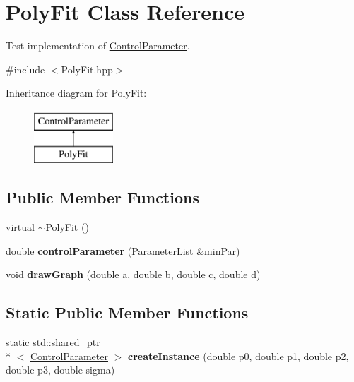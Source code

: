 \hypertarget{class_poly_fit}{\section{Poly\-Fit Class Reference}
\label{class_poly_fit}
}


Test implementation of \hyperlink{class_control_parameter}{Control\-Parameter}.  




{\ttfamily \#include $<$Poly\-Fit.\-hpp$>$}

Inheritance diagram for Poly\-Fit\-:\begin{figure}[H]
\begin{center}
\leavevmode
\includegraphics[height=2.000000cm]{class_poly_fit}
\end{center}
\end{figure}
\subsection*{Public Member Functions}
\begin{DoxyCompactItemize}
\item 
virtual \hyperlink{class_poly_fit_a3462736e02f02d3ab46ccd64aaf235d3}{$\sim$\-Poly\-Fit} ()
\item 
\hypertarget{class_poly_fit_a570b3d6805251459ef55904219726809}{double {\bfseries control\-Parameter} (\hyperlink{class_parameter_list}{Parameter\-List} \&min\-Par)}\label{class_poly_fit_a570b3d6805251459ef55904219726809}

\item 
\hypertarget{class_poly_fit_ad90dd471fea18051d5c0c2e5b483f0a5}{void {\bfseries draw\-Graph} (double a, double b, double c, double d)}\label{class_poly_fit_ad90dd471fea18051d5c0c2e5b483f0a5}

\end{DoxyCompactItemize}
\subsection*{Static Public Member Functions}
\begin{DoxyCompactItemize}
\item 
\hypertarget{class_poly_fit_a9a45808e526e84a5a8af50ff055d0c80}{static std\-::shared\-\_\-ptr\\*
$<$ \hyperlink{class_control_parameter}{Control\-Parameter} $>$ {\bfseries create\-Instance} (double p0, double p1, double p2, double p3, double sigma)}\label{class_poly_fit_a9a45808e526e84a5a8af50ff055d0c80}

\end{DoxyCompactItemize}
